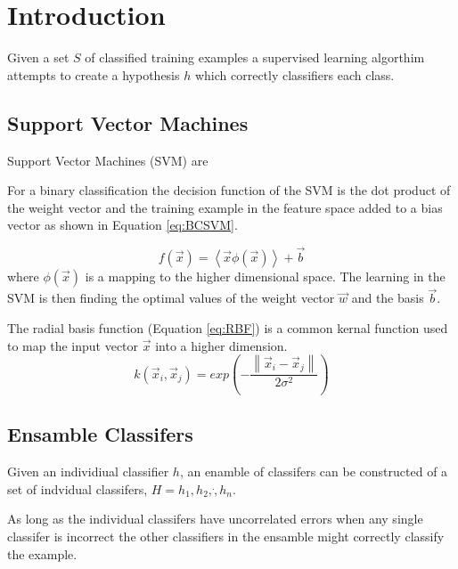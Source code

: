 \section{Introduction}

Given a set $S$ of classified training examples a supervised learning algorthim attempts to create a hypothesis $h$ which correctly classifiers each class.

\subsection{Support Vector Machines}
Support Vector Machines (SVM) are

For a binary classification the decision function of the SVM is the dot product of the weight vector and the training example in the feature space added to a bias vector as shown in Equation \ref{eq:BCSVM}.

\begin{equation}
\label{eq:BCSVM}
f \left ( \vec{x} \right ) = \left \langle \vec{x} \phi(\vec{x}) \right \rangle + \vec{b}
\end{equation}
where $\phi(\vec{x})$ is a mapping to the higher dimensional space.
The learning in the SVM is then finding the optimal values of the weight vector $\vec{w}$ and the basis $\vec{b}$.

The radial basis function (Equation \ref{eq:RBF}) is a common kernal function used to map the input vector $\vec{x}$ into a higher dimension.
\begin{equation}
\label{eq:RBF}
k \left ( \vec{x}_i , \vec{x}_j \right ) = exp \left ( - \frac{\left \| \vec{x}_i - \vec{x}_j \right \|}{2\sigma^2} \right ) 
\end{equation}

\subsection{Ensamble Classifers}
Given an individiual classifier $h$, an enamble of classifers can be constructed of a set of indvidual classifers, $H={h_1, h_2,\dot, h_n}$.

As long as the individual classifers have uncorrelated errors when any single classifer is incorrect the other classifiers in the ensamble might correctly classify the example.

